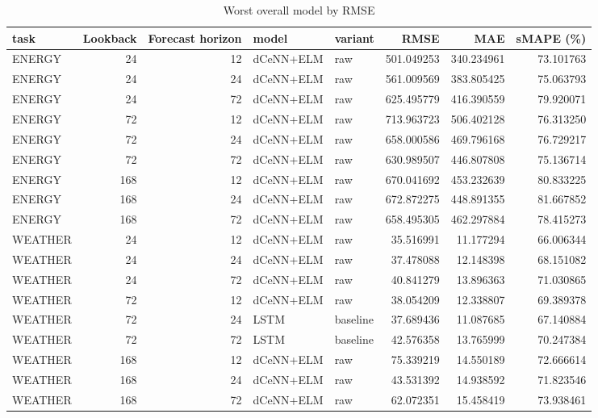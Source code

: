 \begin{table}
\caption{Worst overall model by RMSE}
\begin{tabular}{lrrllrrr}
\toprule
task & Lookback & Forecast horizon & model & variant & RMSE & MAE & sMAPE (\%) \\
\midrule
ENERGY & 24 & 12 & dCeNN+ELM & raw & 501.049253 & 340.234961 & 73.101763 \\
ENERGY & 24 & 24 & dCeNN+ELM & raw & 561.009569 & 383.805425 & 75.063793 \\
ENERGY & 24 & 72 & dCeNN+ELM & raw & 625.495779 & 416.390559 & 79.920071 \\
ENERGY & 72 & 12 & dCeNN+ELM & raw & 713.963723 & 506.402128 & 76.313250 \\
ENERGY & 72 & 24 & dCeNN+ELM & raw & 658.000586 & 469.796168 & 76.729217 \\
ENERGY & 72 & 72 & dCeNN+ELM & raw & 630.989507 & 446.807808 & 75.136714 \\
ENERGY & 168 & 12 & dCeNN+ELM & raw & 670.041692 & 453.232639 & 80.833225 \\
ENERGY & 168 & 24 & dCeNN+ELM & raw & 672.872275 & 448.891355 & 81.667852 \\
ENERGY & 168 & 72 & dCeNN+ELM & raw & 658.495305 & 462.297884 & 78.415273 \\
WEATHER & 24 & 12 & dCeNN+ELM & raw & 35.516991 & 11.177294 & 66.006344 \\
WEATHER & 24 & 24 & dCeNN+ELM & raw & 37.478088 & 12.148398 & 68.151082 \\
WEATHER & 24 & 72 & dCeNN+ELM & raw & 40.841279 & 13.896363 & 71.030865 \\
WEATHER & 72 & 12 & dCeNN+ELM & raw & 38.054209 & 12.338807 & 69.389378 \\
WEATHER & 72 & 24 & LSTM & baseline & 37.689436 & 11.087685 & 67.140884 \\
WEATHER & 72 & 72 & LSTM & baseline & 42.576358 & 13.765999 & 70.247384 \\
WEATHER & 168 & 12 & dCeNN+ELM & raw & 75.339219 & 14.550189 & 72.666614 \\
WEATHER & 168 & 24 & dCeNN+ELM & raw & 43.531392 & 14.938592 & 71.823546 \\
WEATHER & 168 & 72 & dCeNN+ELM & raw & 62.072351 & 15.458419 & 73.938461 \\
\bottomrule
\end{tabular}
\end{table}
